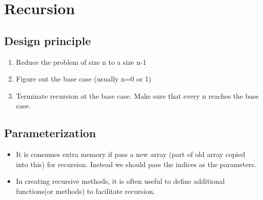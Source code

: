 \documentclass{article}
\title{}
\author{Vishal Neeli}
\begin{document}
\maketitle

\section{Recursion}

\subsection{Design principle}
\begin{enumerate}
	\item Reduce the problem of size n to a size n-1
	\item Figure out the base case (usually n=0 or 1)
	\item Terminate recursion at the base case. Make sure that every n reaches the base case.

\end{enumerate}

\subsection{Parameterization}
\begin{itemize}
	\item It is consumes extra memory if pass a new array (part of old array copied into this) for recursion. Instead we should pass the indices as the parameters.
	\item In creating recursive methods, it is often useful to define additional functions(or methods) to facilitate recursion.

\end{itemize}
\end{document}
